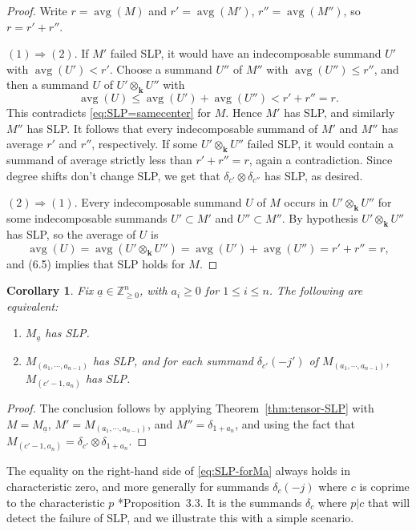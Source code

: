 \documentclass[11pt,reqno]{amsart}
\def\kk{{\mathbf k}}
\newcommand{\oo}{\otimes}
\newcommand{\avg}{\operatorname{avg}}
\newcommand{\bb}[1]{\mathbb{#1}}
\newcommand{\ul}[1]{\underline{#1}}
\newtheorem{corollary}[theorem]{Corollary}
\theoremstyle{definition}
\theoremstyle{remark}
\numberwithin{equation}{section}
\begin{document}
\begin{proof} Write $r=\avg(M)$ and $r'=\avg(M')$, $r''=\avg(M'')$, so $r=r'+r''$.  

\noindent $(1)\Rightarrow (2).$ If $M'$ failed SLP, it would have an indecomposable summand $U'$ with $\avg(U')<r'$.  Choose a summand $U''$ of $M''$ with $\avg(U'')\leq r''$, and then a summand $U$ of $U'\otimes_{\kk} U''$ with
\[
 \avg(U)\leq \avg(U')+\avg(U'')<r'+r''=r.
\]
This contradicts \eqref{eq:SLP=samecenter} for $M$.  Hence $M'$ has SLP, and similarly $M''$ has SLP.  It follows that every indecomposable summand of $M'$ and $M''$ has average $r'$ and $r''$, respectively.  If some $U'\otimes_{\kk} U''$ failed SLP, it would contain a summand of average strictly less than $r'+r''=r$, again a contradiction. Since degree shifts don't change SLP, we get that $\delta_{c'}\oo\delta_{c''}$ has SLP, as desired.

\noindent $(2)\Rightarrow (1).$  Every indecomposable summand $U$ of $M$ occurs in $U'\otimes_{\kk} U''$ for some indecomposable summands $U'\subset M'$ and $U''\subset M''$. By hypothesis $U'\otimes_{\kk} U''$ has SLP, so the average of $U$ is
\[
\avg(U)= \avg(U'\otimes_{\kk} U'')=\avg(U')+\avg(U'')=r'+r''=r,
\]
and (6.5) implies that SLP holds for $M$.
\end{proof}

\begin{corollary}\label{cor:inductive-SLP}
    Fix $\ul{a}\in\bb{Z}^n_{\geq 0}$, with $a_i\geq 0$ for $1\leq i\leq n$. The following are equivalent:
    \begin{enumerate}
        \item $M_{\ul{a}}$ has SLP.
        \item $M_{(a_1,\cdots,a_{n-1})}$ has SLP, and for each summand $\delta_{c'}(-j')$ of $M_{(a_1,\cdots,a_{n-1})}$, $M_{(c'-1,a_n)}$ has SLP.
    \end{enumerate}
\end{corollary}

\begin{proof}
    The conclusion follows by applying Theorem~\ref{thm:tensor-SLP} with $M=M_{\ul{a}}$, $M'=M_{(a_1,\cdots,a_{n-1})}$, and $M''=\delta_{1+a_n}$, and using the fact that $M_{(c'-1,a_n)}=\delta_{c'}\oo \delta_{1+a_n}$.
\end{proof}

The equality on the right-hand side of \eqref{eq:SLP-forMa} always holds in characteristic zero, and more generally for summands $\delta_c(-j)$ where $c$ is coprime to the characteristic $p$ \cite{KMRR}*{Proposition~3.3}. It is the summands $\delta_c$ where $p|c$ that will detect the failure of SLP, and we illustrate this with a simple scenario.
\end{document}
